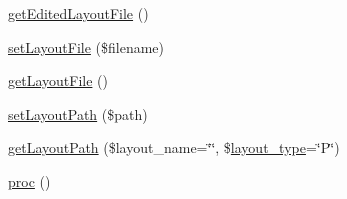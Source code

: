 \begin{DoxyCompactItemize}
\item 
\hyperlink{classModuleObject_a14fc83257a1518a1753c50cb11289c27}{get\-Edited\-Layout\-File} ()
\item 
\hyperlink{classModuleObject_aab99465b1bac81df148c829a3b14f933}{set\-Layout\-File} (\$filename)
\item 
\hyperlink{classModuleObject_af446ac0f9c2a19c2629f30afd6271ec6}{get\-Layout\-File} ()
\item 
\hyperlink{classModuleObject_a15410a43eadf4aa49e4fed4b26cd1f25}{set\-Layout\-Path} (\$path)
\item 
\hyperlink{classModuleObject_ad3f6b56ddff1e52a49015771d0a08336}{get\-Layout\-Path} (\$layout\-\_\-name=\char`\"{}\char`\"{}, \$\hyperlink{ko_8install_8php_a0532d89570cfdaebc628afac2ff5a81b}{layout\-\_\-type}=\char`\"{}P\char`\"{})
\item 
\hyperlink{classModuleObject_a621ea29505c6ccd4444a06bc1c8554a5}{proc} ()
\end{DoxyCompactItemize}

